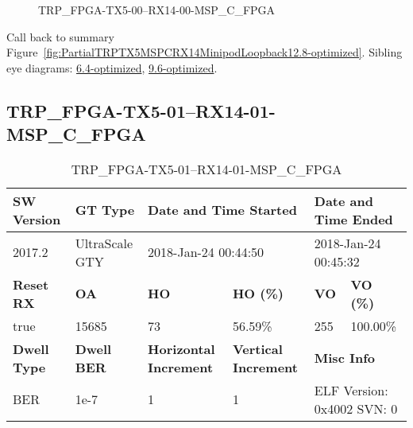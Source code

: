 \begin{figure}[h]
\caption{TRP\_FPGA-TX5-00--RX14-00-MSP\_C\_FPGA} \label{fig:TRPFPGATX500RX1400MSPCFPGA12.8-optimized}
\end{figure}

Call back to summary Figure~\ref{fig:PartialTRPTX5MSPCRX14MinipodLoopback12.8-optimized}.
Sibling eye diagrams: \hyperref[sec:TRPFPGATX500RX1400MSPCFPGA6.4-optimized]{6.4-optimized}, \hyperref[sec:TRPFPGATX500RX1400MSPCFPGA9.6-optimized]{9.6-optimized}.

\clearpage
\newpage


\subsection{TRP\_FPGA-TX5-01--RX14-01-MSP\_C\_FPGA}\label{sec:TRPFPGATX501RX1401MSPCFPGA12.8-optimized}

\begin{table}[h]
\centering
\caption{TRP\_FPGA-TX5-01--RX14-01-MSP\_C\_FPGA}
\label{tab:TRPFPGATX501RX1401MSPCFPGA12.8-optimized}
\begin{tabular}{@{}|l|l|l|l|l|l|@{}}
\toprule
\textbf{SW Version}                & \textbf{GT Type}   & \multicolumn{2}{l|}{\textbf{Date and Time Started}}            & \multicolumn{2}{l|}{\textbf{Date and Time Ended}}        \\ \midrule
2017.2                       & UltraScale GTY          & \multicolumn{2}{l|}{2018-Jan-24 00:44:50}                   & \multicolumn{2}{l|}{2018-Jan-24 00:45:32}               \\ \midrule
\textbf{Reset RX}                  & \textbf{OA} & \textbf{HO}   & \textbf{HO (\%)} & \textbf{VO} & \textbf{VO (\%)} \\ \midrule
true & 15685        & 73          & 56.59\%        & 255        & 100.00\%       \\ \midrule
\textbf{Dwell Type}                & \textbf{Dwell BER} & \textbf{Horizontal Increment} & \textbf{Vertical Increment}    & \multicolumn{2}{l|}{\textbf{Misc Info}}                  \\ \midrule
BER                            & 1e-7        & 1        & 1           & \multicolumn{2}{l|}{ELF Version: 0x4002 SVN: 0}                         \\ \bottomrule
\end{tabular}
\end{table}

